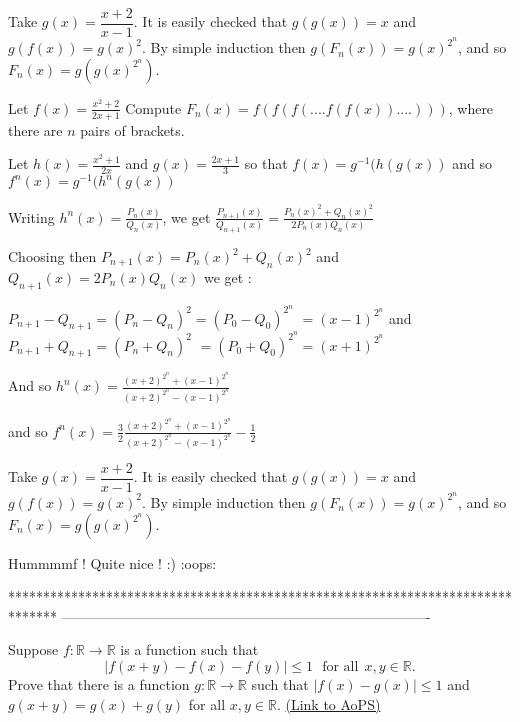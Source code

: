 \begin{solution}
	Take $g(x) = \dfrac {x+2} {x-1}$. It is easily checked that $g(g(x)) = x$ and $g(f(x)) = g(x)^2$. By simple induction then $g(F_n(x)) = g(x)^{2^n}$, and so $F_n(x) = g\left (g(x)^{2^n}\right )$.
\end{solution}



\begin{solution}
	\begin{tcolorbox}Let $f(x)=\frac{x^{2}+2}{2x+1}$
Compute $F_{n}(x)=f(f(f(....f(f(x))....) ) ) $, where there are $n$ pairs of brackets.\end{tcolorbox}
Let $h(x)=\frac{x^2+1}{2x}$ and $g(x)=\frac {2x+1}{3}$ so that $f(x)=g^{-1}(h(g(x))$ and so $f^n(x)=g^{-1}(h^n(g(x))$

Writing $h^n(x)=\frac {P_n(x)}{Q_n(x)}$, we get $\frac{P_{n+1}(x)}{Q_{n+1}(x)}=\frac{P_n(x)^2+Q_n(x)^2}{2P_n(x)Q_n(x)}$

Choosing then  $P_{n+1}(x)=P_n(x)^2+Q_n(x)^2$ and $Q_{n+1}(x)=2P_n(x)Q_n(x)$ we get :

$P_{n+1}-Q_{n+1}=(P_n-Q_n)^2=(P_0-Q_0)^{2^n}$ $=(x-1)^{2^n}$ and $P_{n+1}+Q_{n+1}=(P_n+Q_n)^2$ $=(P_0+Q_0)^{2^n}=(x+1)^{2^n}$

And so $h^n(x)=\frac{(x+2)^{2^n}+(x-1)^{2^n}}{(x+2)^{2^n}-(x-1)^{2^n}}$

and so $\boxed{f^n(x)=\frac 32\frac{(x+2)^{2^n}+(x-1)^{2^n}}{(x+2)^{2^n}-(x-1)^{2^n}}-\frac 12}$
\end{solution}



\begin{solution}
	\begin{tcolorbox}Take $g(x) = \dfrac {x+2} {x-1}$. It is easily checked that $g(g(x)) = x$ and $g(f(x)) = g(x)^2$. By simple induction then $g(F_n(x)) = g(x)^{2^n}$, and so $F_n(x) = g\left (g(x)^{2^n}\right )$.\end{tcolorbox}
Hummmmf ! Quite nice !
:) :oops:
\end{solution}
*******************************************************************************
-------------------------------------------------------------------------------

\begin{problem}
	Suppose $f:\mathbb{R} \to \mathbb{R}$ is a function such that 
\[|f(x+y)-f(x)-f(y)|\le 1\ \ \ \text{for all} \ \  x, y \in\mathbb R.\]
Prove that there is a function $g:\mathbb{R}\to\mathbb{R}$ such that $|f(x)-g(x)|\le 1$ and $g(x+y)=g(x)+g(y)$ for all $x,y \in\mathbb R.$
	\flushright \href{https://artofproblemsolving.com/community/c6h396244}{(Link to AoPS)}
\end{problem}




